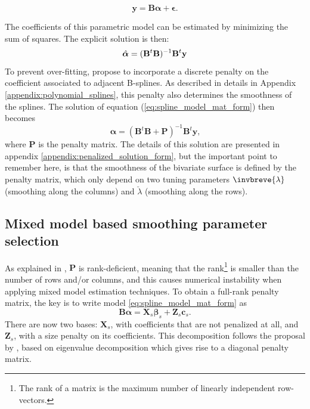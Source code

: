 \begin{equation}
    \boldsymbol{y} = \boldsymbol{B}\boldsymbol{\alpha} + \boldsymbol{\epsilon}
    \text{.}
    \label{eq:spline_model_mat_form}
\end{equation}

The coefficients of this parametric model can be estimated by minimizing the sum of squares. The explicit solution is then:
\begin{equation}
	\Hat{\boldsymbol{\alpha}} = (\mathbf{B}^t\mathbf{B})^{-1}\mathbf{B}^t\mathbf{y}
\end{equation}
To prevent over-fitting, 
\textcite{eilers_flexible_1996} propose to incorporate a discrete penalty on the coefficient associated to adjacent B-splines.
As described in details in Appendix \ref{appendix:polynomial_splines}, this penalty also determines the smoothness of the 
splines. The solution of equation (\ref{eq:spline_model_mat_form}) then becomes 
\begin{equation}
    \widehat{\boldsymbol{\alpha}}=\left(\boldsymbol{B}^{t} \boldsymbol{B}+\boldsymbol{P}\right)^{-1} \boldsymbol{B}^{t} 
    \boldsymbol{y}
    \text{,}
\end{equation}
where $\boldsymbol{P}$ is the penalty matrix. The details of this solution are presented in appendix 
\ref{appendix:penalized_solution_form}, but the important point to remember here, is that the smoothness of the bivariate 
surface is defined by the penalty matrix, which only depend on two tuning parameters  $\invbreve{\lambda}$ (smoothing along the 
columns) and $\breve{\lambda}$ (smoothing along the rows).

\subsection{Mixed model based smoothing parameter selection}

As explained in \textcite{rodriguez-alvarez_spatial_2016}, $\mathbf{P}$ is rank-deficient, meaning that the rank\footnote{The rank of a matrix is the maximum number of linearly independent row-vectors.} is smaller than the 
number of rows and/or columns, and this causes numerical instability when applying mixed model estimation techniques. To obtain 
a full-rank penalty matrix, the key is to write model \ref{eq:spline_model_mat_form} as 
\begin{equation}
    \mathbf{B}\boldsymbol{\alpha} = \boldsymbol{X}_{s} \boldsymbol{\beta}_{s}+\boldsymbol{Z}_{s} \boldsymbol{c}_{s}
    \text{.}
\end{equation}
There are now two bases: $\mathbf{X}_{s}$, with coefficients that are not penalized at all, and $\mathbf{Z}_{s}$, with a size 
penalty on its coefficients. This decomposition follows the proposal by \textcite{lee_p-spline_2011}, based on eigenvalue 
decomposition which gives rise to a diagonal penalty matrix.\\

